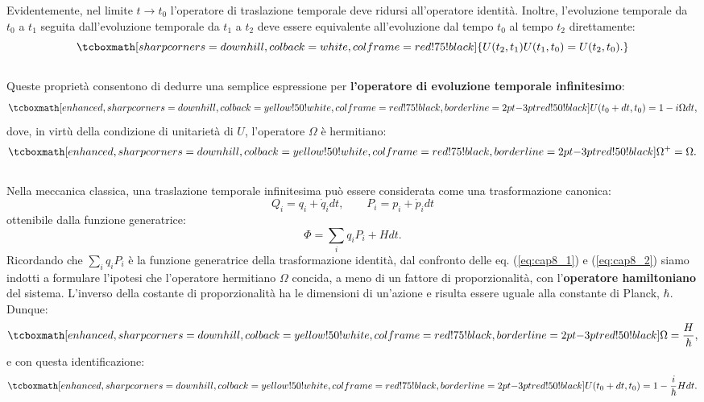 Evidentemente, nel limite $t\longrightarrow t_0$ l'operatore di traslazione temporale deve ridursi all'operatore identità. Inoltre, l'evoluzione temporale da $t_0$ a $t_1$ seguita dall'evoluzione temporale da $t_1$ a $t_2$ deve essere equivalente all'evoluzione dal tempo $t_0$ al tempo $t_2$ direttamente:
	\begin{equation}
		\tcboxmath[sharp corners=downhill, colback=white, colframe=red!75!black]{
			U (t_2,t_1) U(t_1,t_0)=U(t_2,t_0).
			}
	\end{equation}\\
	
Queste proprietà consentono di dedurre una semplice espressione per \textbf{l'operatore di evoluzione temporale infinitesimo}:
	\begin{equation}
		\tcboxmath[enhanced, sharp corners=downhill, colback=yellow!50!white, colframe=red!75!black, borderline={2pt}{-3pt}{red!50!black}]{
			U(t_0+dt,t_0) = 1-i\Omega dt,
			}
		\label{eq:cap8_1}
	\end{equation}
dove, in virtù della condizione di unitarietà di $U$, l'operatore $\Omega$ è hermitiano:
	\begin{equation}
		\tcboxmath[enhanced, sharp corners=downhill, colback=yellow!50!white, colframe=red!75!black, borderline={2pt}{-3pt}{red!50!black}]{
			\Omega ^+ = \Omega.
			}
	\end{equation}\\
	
Nella meccanica classica, una traslazione temporale infinitesima può essere considerata come una trasformazione canonica:
\begin{equation}
Q_i = q_i+\dot{q}_idt, \qquad P_i = p_i+\dot{p}_idt
\end{equation}
ottenibile dalla funzione generatrice:
\begin{equation}
\Phi = \sum _i q_iP_i+ Hdt.
\label{eq:cap8_2}
\end{equation}
Ricordando che $\sum _i q_iP_i$ è la funzione generatrice della trasformazione identità, dal confronto delle eq. (\ref{eq:cap8_1}) e (\ref{eq:cap8_2}) siamo indotti a formulare l'ipotesi che l'operatore hermitiano $\Omega$ concida, a meno di un fattore di proporzionalità, con l'\textbf{operatore hamiltoniano} del sistema. L'inverso della costante di proporzionalità ha le dimensioni di un'azione e risulta essere uguale alla constante di Planck, $\hbar$. Dunque:
	\begin{equation}
		\tcboxmath[enhanced, sharp corners=downhill, colback=yellow!50!white, colframe=red!75!black, borderline={2pt}{-3pt}{red!50!black}]{
		\Omega = \frac{H}{\hbar},
		}
	\end{equation}
e con questa identificazione:
	\begin{equation}
		\tcboxmath[enhanced, sharp corners=downhill, colback=yellow!50!white, colframe=red!75!black, borderline={2pt}{-3pt}{red!50!black}]{
			U(t_0+dt,t_0) =1-\frac{i}{\hbar}Hdt.
			}
	\end{equation}
	
